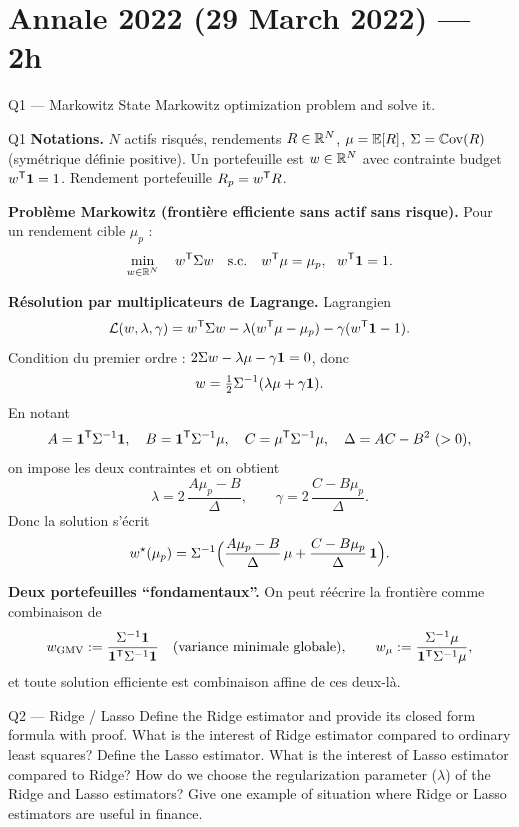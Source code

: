 \section{Annale 2022 (29 March 2022) --- 2h}

\begin{questionbox}{Q1 --- Markowitz}
State Markowitz optimization problem and solve it.
\end{questionbox}

\begin{solutionbox}{Q1}
\textbf{Notations.} $N$ actifs risqués, rendements $R\in\mathbb{R}^N$, $\mu=\mathbb{E}[R]$, $\Sigma=\mathbb{C}\mathrm{ov}(R)$ (symétrique définie positive). Un portefeuille est $w\in\mathbb{R}^N$ avec contrainte budget $w^{\mathsf{T}} \mathbf{1} = 1$. Rendement portefeuille $R_p=w^{\mathsf{T}} R$.

\medskip
\textbf{Problème Markowitz (frontière efficiente sans actif sans risque).} Pour un rendement cible $\mu_p$ :
\[
\min_{w\in\mathbb{R}^N}\quad w^{\mathsf{T}} \Sigma w
\quad\text{s.c.}\quad
w^{\mathsf{T}} \mu=\mu_p,\ \ w^{\mathsf{T}} \mathbf{1}=1.
\]

\medskip
\textbf{Résolution par multiplicateurs de Lagrange.} Lagrangien
\[
\mathcal{L}(w,\lambda,\gamma)=w^{\mathsf{T}}\Sigma w - \lambda(w^{\mathsf{T}}\mu-\mu_p) - \gamma(w^{\mathsf{T}}\mathbf{1}-1).
\]
Condition du premier ordre : $2\Sigma w - \lambda\mu - \gamma \mathbf{1}=0$, donc
\[
w=\tfrac12 \Sigma^{-1}(\lambda\mu+\gamma\mathbf{1}).
\]
En notant
\[
A=\mathbf{1}^{\mathsf{T}} \Sigma^{-1}\mathbf{1},\quad
B=\mathbf{1}^{\mathsf{T}} \Sigma^{-1}\mu,\quad
C=\mu^{\mathsf{T}} \Sigma^{-1}\mu,\quad
\Delta=AC-B^2\ (>0),
\]
on impose les deux contraintes et on obtient
\[
\lambda = 2\,\frac{A\mu_p-B}{\Delta},
\qquad
\gamma = 2\,\frac{C-B\mu_p}{\Delta}.
\]
Donc la solution s'écrit
\[
w^\star(\mu_p)=\Sigma^{-1}\Big(\frac{A\mu_p-B}{\Delta}\,\mu + \frac{C-B\mu_p}{\Delta}\,\mathbf{1}\Big).
\]

\medskip
\textbf{Deux portefeuilles ``fondamentaux''.} On peut réécrire la frontière comme combinaison de
\[
w_{\mathrm{GMV}}:=\frac{\Sigma^{-1}\mathbf{1}}{\mathbf{1}^{\mathsf{T}}\Sigma^{-1}\mathbf{1}}\quad\text{(variance minimale globale)},
\qquad
w_{\mu}:=\frac{\Sigma^{-1}\mu}{\mathbf{1}^{\mathsf{T}}\Sigma^{-1}\mu},
\]
et toute solution efficiente est combinaison affine de ces deux-là.
\end{solutionbox}

\begin{questionbox}{Q2 --- Ridge / Lasso}
Define the Ridge estimator and provide its closed form formula with proof. What is the interest of Ridge estimator compared to ordinary least squares? Define the Lasso estimator. What is the interest of Lasso estimator compared to Ridge? How do we choose the regularization parameter ($\lambda$) of the Ridge and Lasso estimators? Give one example of situation where Ridge or Lasso estimators are useful in finance.
\end{questionbox}

